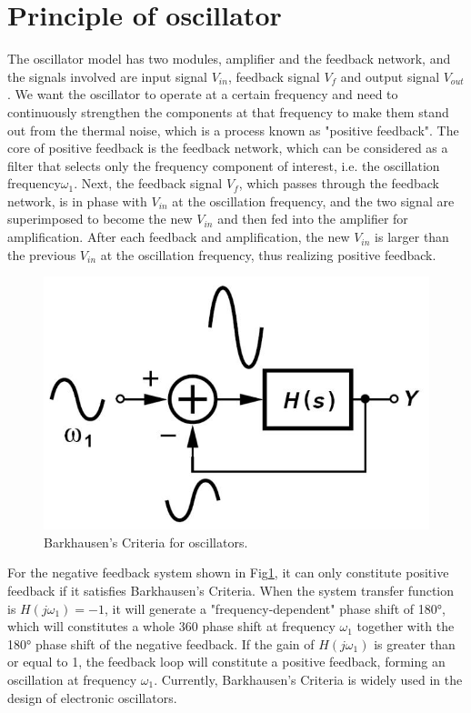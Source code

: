 \documentclass[conference]{IEEEtran}
\begin{document}
\section{Principle of oscillator}\label{sec2}

The oscillator model has two modules, amplifier and the feedback network, and the signals involved are input signal $V_{in}$, feedback signal $V_f$ and output signal $V_{out}$. We want the oscillator to operate at a certain frequency and need to continuously strengthen the components at that frequency to make them stand out from the thermal noise, which is a process known as "positive feedback". The core of positive feedback is the feedback network, which can be considered as a filter that selects only the frequency component of interest, i.e. the oscillation frequency$\omega_1$. Next, the feedback signal $V_f$, which passes through the feedback network, is in phase with $V_{in}$ at the oscillation frequency, and the two signal are superimposed to become the new $V_{in}$ and then fed into the amplifier for amplification. After each feedback and amplification, the new $V_{in}$ is larger than the previous $V_{in}$ at the oscillation frequency, thus realizing positive feedback.

\begin{figure}[!h]
\centerline{\includegraphics[scale=0.25]{fig/pic2-1.png}}
\caption{Barkhausen's Criteria for oscillators.}
\label{fig2-1}
\end{figure}

For the negative feedback system shown in Fig\ref{fig2-1}, it can only constitute positive feedback if it satisfies Barkhausen's Criteria. When the system transfer function is $H(j\omega_1)=-1$, it will generate a "frequency-dependent" phase shift of 180°, which will constitutes a whole 360 phase shift at frequency $\omega_1$ together with the 180° phase shift of the negative feedback. If the gain of $H(j\omega_1)$ is greater than or equal to 1, the feedback loop will constitute a positive feedback, forming an oscillation at frequency $\omega_1$. Currently, Barkhausen's Criteria is widely used in the design of electronic oscillators.
\end{document}
